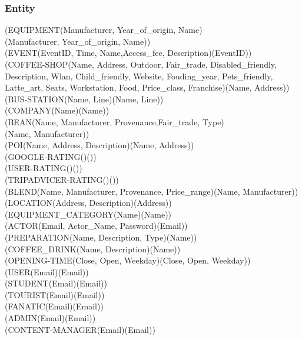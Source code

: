 \subsubsection{Entity}
(EQUIPMENT(Manufacturer, Year\_of\_origin, Name)\\(Manufacturer, Year\_of\_origin, Name))\\
(EVENT(EventID, Time, Name,Access\_fee, Description)(EventID))\\
(COFFEE-SHOP(Name, Address, Outdoor, Fair\_trade, Disabled\_friendly, Description, Wlan, Child\_friendly, Website, Fouding\_year, Pets\_friendly, Latte\_art, Seats, Workstation, Food, Price\_class, Franchise)(Name, Address))\\
(BUS-STATION(Name, Line)(Name, Line))\\
(COMPANY(Name)(Name))\\
(BEAN(Name, Manufacturer, Provenance,Fair\_trade, Type)\\(Name, Manufacturer))\\
(POI(Name, Address, Description)(Name, Address))\\
(GOOGLE-RATING()())\\
(USER-RATING()())\\
(TRIPADVICER-RATING()())\\
(BLEND(Name, Manufacturer, Provenance, Price\_range)(Name, Manufacturer))\\
(LOCATION(Address, Description)(Address))\\
(EQUIPMENT\_CATEGORY(Name)(Name))\\
(ACTOR(Email, Actor\_Name, Password)(Email))\\
(PREPARATION(Name, Description, Type)(Name))\\
(COFFEE\_DRINK(Name, Description)(Name))\\
(OPENING-TIME(Close, Open, Weekday)(Close, Open, Weekday))\\
(USER(Email)(Email))\\
(STUDENT(Email)(Email))\\
(TOURIST(Email)(Email))\\
(FANATIC(Email)(Email))\\
(ADMIN(Email)(Email))\\
(CONTENT-MANAGER(Email)(Email))\\
